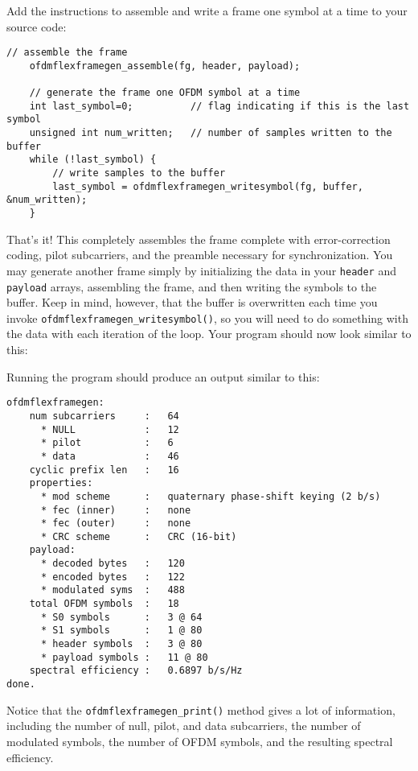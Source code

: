Add the instructions to assemble and write a frame one symbol at a time
to your source code:
%
\begin{Verbatim}[fontsize=\small]
    // assemble the frame
    ofdmflexframegen_assemble(fg, header, payload);

    // generate the frame one OFDM symbol at a time
    int last_symbol=0;          // flag indicating if this is the last symbol
    unsigned int num_written;   // number of samples written to the buffer
    while (!last_symbol) {
        // write samples to the buffer
        last_symbol = ofdmflexframegen_writesymbol(fg, buffer, &num_written);
    }
\end{Verbatim}
%
That's it!
This completely assembles the frame complete with error-correction
coding, pilot subcarriers, and the preamble necessary for
synchronization.
You may generate another frame simply by
  initializing the data in your {\tt header} and {\tt payload} arrays,
  assembling the frame,
  and then writing the symbols to the buffer.
Keep in mind, however, that the buffer is overwritten each time you
invoke {\tt ofdmflexframegen\_writesymbol()},
so you will need to do something with the data with each iteration of
the loop.
%
Your program should now look similar to this:
%

%
Running the program should produce an output similar to this:
%
\begin{Verbatim}[fontsize=\small]
ofdmflexframegen:
    num subcarriers     :   64
      * NULL            :   12
      * pilot           :   6
      * data            :   46
    cyclic prefix len   :   16
    properties:
      * mod scheme      :   quaternary phase-shift keying (2 b/s)
      * fec (inner)     :   none
      * fec (outer)     :   none
      * CRC scheme      :   CRC (16-bit)
    payload:
      * decoded bytes   :   120
      * encoded bytes   :   122
      * modulated syms  :   488
    total OFDM symbols  :   18
      * S0 symbols      :   3 @ 64
      * S1 symbols      :   1 @ 80
      * header symbols  :   3 @ 80
      * payload symbols :   11 @ 80
    spectral efficiency :   0.6897 b/s/Hz
done.
\end{Verbatim}
%
Notice that the {\tt ofdmflexframegen\_print()} method gives a lot of
information, including
the number of null, pilot, and data subcarriers,
the number of modulated symbols,
the number of OFDM symbols,
and the resulting spectral efficiency.

%
%
